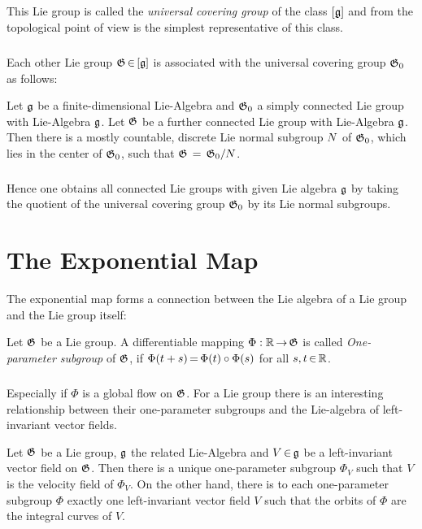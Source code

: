 \documentclass[11pt,twoside]{article}
\begin{document}
\subparagraph{}
This Lie group is called the
\textit{universal covering group} of the class $[{\mathfrak{g}}]$ and
from the topological point of view is the simplest representative of this class.

\subparagraph{}
Each other Lie group $\mathfrak{G} {\,\in\,} [{\mathfrak{g}}]$ is associated
with the universal covering group $\mathfrak{G}_0$ as follows:

\begin{theorem}
Let ${\mathfrak{g}}$ be a finite-dimensional Lie-Algebra
and $\mathfrak{G}_0$ a simply connected Lie group with Lie-Algebra ${\mathfrak{g}}$.
Let $\mathfrak{G}$ be a further connected Lie group with Lie-Algebra ${\mathfrak{g}}$.
Then there is a mostly countable, discrete Lie normal subgroup ${N}$
of $\mathfrak{G}_0$,
which lies in the center of $\mathfrak{G}_0$,
such that $\mathfrak{G} \,=\, \mathfrak{G}_0 / {N}$.
\end{theorem}

\subparagraph{}
Hence one obtains all connected Lie groups with given Lie algebra ${\mathfrak{g}}$
by taking the quotient of the universal covering group $\mathfrak{G}_0$
by its Lie normal subgroups.

\section{The Exponential Map}
The exponential map forms a connection between the Lie algebra
of a Lie group and the Lie group itself:

\begin{definition}
Let $\mathfrak{G}$ be a Lie group.
A differentiable mapping $\Phi:{\mathbb{R}} {\,\to\,} \mathfrak{G}$ is called
\textit{One-parameter subgroup} of $\mathfrak{G}$,
if $\Phi(t+s) {\,=\,} \Phi(t) \circ \Phi(s)$ for all $s,t {\,\in\,} {\mathbb{R}}$.
\end{definition}

\subparagraph{}
Especially if $\Phi$ is a global flow on $\mathfrak{G}$.
For a Lie group there is an interesting relationship
between their one-parameter subgroups
and the Lie-algebra of left-invariant vector fields.

\begin{theorem}
Let $\mathfrak{G}$ be a Lie group, ${\mathfrak{g}}$ the related Lie-Algebra
and $V {\,\in\,} {\mathfrak{g}}$ be a left-invariant vector field on $\mathfrak{G}$.
Then there is a unique one-parameter subgroup $\Phi_V$
such that $V$ is the velocity field of $\Phi_V$.
On the other hand,
there is to each one-parameter subgroup $\Phi$ exactly one
left-invariant vector field $V$
such that the orbits of $\Phi$ are the integral curves of $V$.
\end{theorem}
\end{document}
